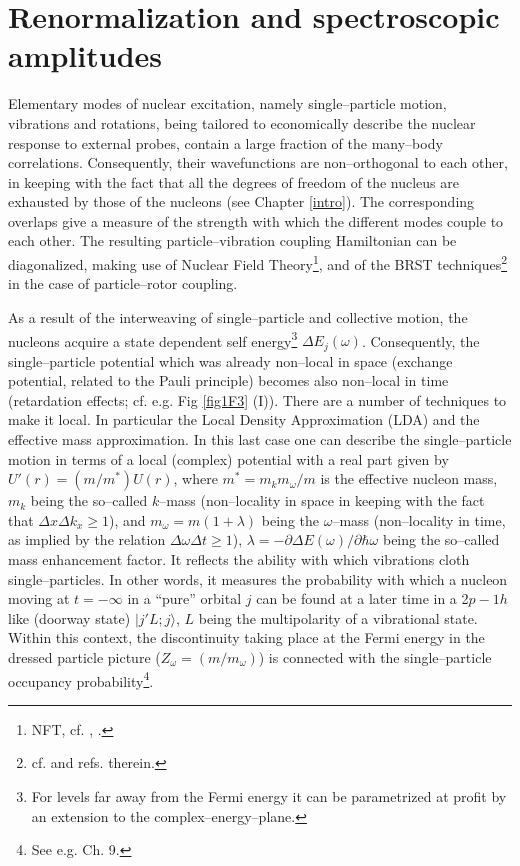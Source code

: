 \section{Renormalization and spectroscopic amplitudes}
 Elementary modes of nuclear excitation, namely single--particle motion, vibrations and rotations, being tailored to economically describe the nuclear response to external probes, contain a large fraction of the many--body correlations. Consequently, their wavefunctions are non--orthogonal to each other, in keeping with the fact that all the degrees of freedom of the nucleus are exhausted by those of the nucleons (see Chapter \ref{intro}). The corresponding overlaps give a measure of the strength with which the different modes couple to each other. The  resulting particle--vibration coupling Hamiltonian can be diagonalized,  making use of Nuclear Field Theory\footnote{NFT, cf. \cite{Bortignon:77}, \cite{Bortignon:78}.}, and of the  BRST techniques\footnote{cf. \cite{Bes:90} and refs. therein.} in the case of particle--rotor coupling. 



As a result of the interweaving of single--particle and collective motion, the nucleons acquire a state dependent self energy\footnote{For levels far away from the Fermi energy it can be parametrized at profit by an extension to the complex--energy--plane.} $\Delta E_j(\omega)$.   Consequently, the single--particle potential which was already non--local in space (exchange potential, related to the Pauli principle) becomes also non--local in time (retardation effects; cf. e.g. Fig \ref{fig1F3} (I)). There are a number of techniques to make it local. In particular the Local Density Approximation (LDA) and the effective mass approximation. In this last case one can describe the single--particle motion in terms of a local (complex) potential with a real part given by $U'(r)=(m/m^*)U(r)$, where $m^*=m_km_\omega/m$ is the effective nucleon mass, $m_k$ being the so--called $k$--mass (non--locality in space in keeping with the fact that $\Delta x\Delta k_x\geq1$), and $m_\omega=m(1+\lambda)$ being the $\omega$--mass (non--locality in time, as implied by the relation $\Delta \omega\Delta t\geq1$),  $\lambda=-\partial \Delta E(\omega)/\partial \hbar \omega$ being the so--called mass enhancement factor. It reflects the ability with which vibrations cloth single--particles. In other words, it measures the probability with which a nucleon moving at  $t=-\infty$ in a ``pure'' orbital $j$ can be found at a later time in a 2$p-1h$ like (doorway state) $|j'L;j\rangle$, $L$ being the multipolarity of a vibrational state. Within this context, the discontinuity taking place at the Fermi energy in the dressed particle picture ($Z_\omega=(m/m_\omega)$) is connected with the single--particle occupancy probability\footnote{See e.g. \cite{Brink:05} Ch. 9.}.


